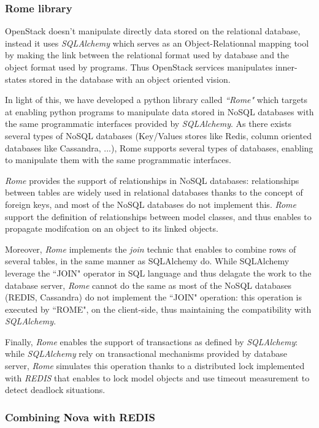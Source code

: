 \subsubsection{Rome library}

OpenStack doesn't manipulate directly data stored on the relational database,
instead it uses \textit{SQLAlchemy} which serves as an Object-Relationnal
mapping tool by making the link between the relational format used by database
and the object  format used by programs. Thus OpenStack services manipulates
inner-states stored in the database with an object oriented vision.

In light of this, we have developed a python library called \textit{``Rome"}
which targets at enabling python programs to manipulate data stored in NoSQL
databases with the same programmatic interfaces provided by \textit{SQLAlchemy}.
As there exists several types of NoSQL databases (Key/Values stores like Redis,
column oriented databases like Cassandra, ...), Rome supports several types of
databases, enabling to manipulate them with the same programmatic interfaces.

\textit{Rome} provides the support of relationships in NoSQL databases: 
relationships between tables are widely used in relational databases thanks to
the concept of foreign keys, and most of the NoSQL databases do not implement
this. \textit{Rome} support the definition of relationships between model
classes, and thus enables to propagate modifcation on an object to its linked
objects.

Moreover, \textit{Rome} implements the \textit{join} technic that enables to
combine rows of several tables, in the same manner as SQLAlchemy do. While
SQLAlchemy leverage the ``JOIN" operator in SQL language and thus delagate the
work to the database server, \textit{Rome} cannot do the same as most of the
NoSQL databases (REDIS, Cassandra) do not implement the ``JOIN" operation: this
operation is executed by ``ROME", on the client-side, thus maintaining the
compatibility with \textit{SQLAlchemy}.

Finally, \textit{Rome} enables the support of transactions as defined by
\textit{SQLAlchemy}: while \textit{SQLAlchemy} rely on transactional mechanisms
provided by database server, \textit{Rome} simulates this operation thanks to
a distributed lock implemented with \textit{REDIS} that enables to lock model
objects and use timeout measurement to detect deadlock situations.

\subsubsection{Combining Nova with REDIS}

